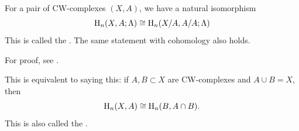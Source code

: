 \documentclass[../main]{subfiles}
\begin{document}
\begin{theorem*}[Excision]
For a pair of CW-complexes $(X,A)$, we have a natural isomorphism
\[
\operatorname{H}_n(X,A;\Lambda)\cong \operatorname{H}_n(X/A, A/A;\Lambda)
\]
This is called the . The same statement with cohomology also holds.
\end{theorem*}
For proof, see \cite[p. 119]{hatcher2002algebraic}.

This is equivalent to saying this: if $A,B\subset X$ are CW-complexes and \newline $A\cup B=X$, then
\[\operatorname{H}_n(X,A) \cong \operatorname{H}_n(B,A\cap B).\]
This is also called the .
\end{document}
